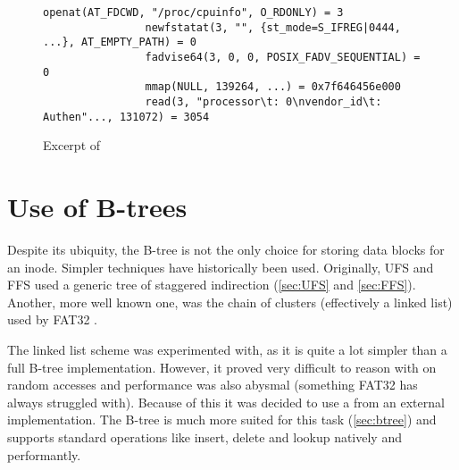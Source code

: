        \begin{figure}[h]
            \begin{lstlisting}[gobble=16]
                openat(AT_FDCWD, "/proc/cpuinfo", O_RDONLY) = 3
                newfstatat(3, "", {st_mode=S_IFREG|0444, ...}, AT_EMPTY_PATH) = 0
                fadvise64(3, 0, 0, POSIX_FADV_SEQUENTIAL) = 0
                mmap(NULL, 139264, ...) = 0x7f646456e000
                read(3, "processor\t: 0\nvendor_id\t: Authen"..., 131072) = 3054
            \end{lstlisting}
            \caption{Excerpt of }
            \label{fig:cat_strace}
            \vspace{-20pt}
        \end{figure}

    \section{Use of B-trees}
        \label{sec:design_btree}

        Despite its ubiquity, the B-tree is not the only choice for storing
        data blocks for an inode. Simpler techniques have historically been
        used. Originally, UFS and FFS used a generic tree of staggered
        indirection (\autoref{sec:UFS} and \autoref{sec:FFS}). Another, more well known
        one, was the chain of clusters (effectively a linked list) used by
        FAT32 \cite{fat32}.

        The linked list scheme was experimented with, as it is quite a lot
        simpler than a full B-tree implementation. However, it proved very
        difficult to reason with on random accesses and performance was also
        abysmal (something FAT32 has always struggled with). Because of this
        it was decided to use a \bplustree from an external implementation. The
        B-tree is much more suited for this task (\autoref{sec:btree}) and supports
        standard operations like insert, delete and lookup natively and
        performantly.

